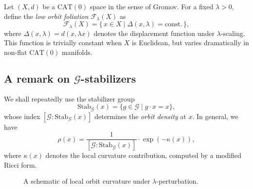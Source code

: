 \documentclass{amsart}
\begin{document}
Let %
$(X,d)$ be a $\mathrm{CAT}(0)$ space in the sense of Gromov.  
For a fixed $\lambda > 0$, define the \emph{low orbit foliation} $\mathcal{F}_\lambda(X)$ as
\begin{equation}\label{eq:foliation}
    \mathcal{F}_\lambda(X) = \{\,x \in X \mid \Delta(x, \lambda) = \text{const.}\,\},
\end{equation}
where $\Delta(x, \lambda) = d(x, \lambda x)$ denotes the displacement function under $\lambda$-scaling.  
This function is trivially constant when $X$ is Euclidean, but varies dramatically %
in non-flat $\mathrm{CAT}(0)$ %
manifolds.

\subsection{A remark on $\mathcal{G}$-stabilizers}
We shall repeatedly use the stabilizer %
group
\[
    \mathrm{Stab}_{\mathcal{G}}(x) = \{ g \in \mathcal{G} \mid g \cdot x = x \},
\]
whose %
index $[\mathcal{G} : \mathrm{Stab}_{\mathcal{G}}(x)]$ determines the \emph{orbit density} at $x$.  
In general, we have
\begin{equation}\label{eq:orbit-density}
    \rho(x) = \frac{1}{[\mathcal{G} : \mathrm{Stab}_{\mathcal{G}}(x)]} \cdot \exp(-\kappa(x)),
\end{equation}
where $\kappa(x)$ denotes the local curvature contribution, computed by a modified Ricci form.

\begin{figure}[htbp]
\centering
{}
\caption{A schematic of local orbit curvature under %
$\lambda$-perturbation.%
}
\label{fig:curvature}
\end{figure}
\end{document}
